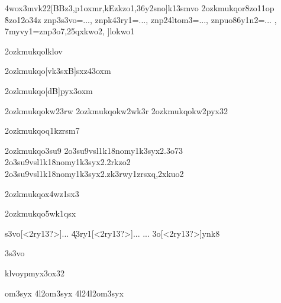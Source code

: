\nym4wox3mvk22[BBz3,p1oxmr,kEzkzo1,36y2sno]{k13smvo}  %
\42ozkmukqo{r8zo11op}
\r8zo12o34z{%
	znp3s3vo={...},%
	znpk43ry1={...},%
	znp24ltom3={...},%
	znpuo86y1n2={...}%
      },%
7myvy1={znp3o7,25qxkwo2}, %
]{lokwo1}  %

\42ozkmukqo{lklov}

\42ozkmukqo[vk3sxB]{sxz43oxm}

\42ozkmukqo[dB]{pyx3oxm}      %

\42ozkmukqo{kw23rw}
\42ozkmukqo{kw2wk3r}
\42ozkmukqo{kw2pyx32}

\42ozkmukqo{q1kzrsm7}

\42ozkmukqo{3su9}
\42o3su9vsl1k18{nomy1k3syx2.3o73}
\42o3su9vsl1k18{nomy1k3syx2.2rkzo2} 
\42o3su9vsl1k18{nomy1k3syx2.zk3rwy1zrsxq,2xkuo2}

\42ozkmukqo{x4wz1sx3}

\42ozkmukqo{5wk1qsx}

\3s3vo[<2ry13?>]{...}
\k43ry1[<2ry13?>]{... \kxn ...}
\nk3o[<2ry13?>]{\3ynk8{}}



\wkuo3s3vo

\3klvoypmyx3ox32


\2om3syx{}
\24l2om3syx{}
\24l24l2om3syx{}




